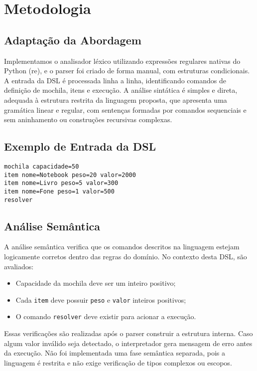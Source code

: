 \documentclass[conference]{IEEEtran}
\begin{document}
\section{Metodologia}

\subsection{Adaptação da Abordagem}
Implementamos o analisador léxico utilizando expressões regulares nativas do Python (re), e o parser foi criado de forma manual, com estruturas condicionais. A entrada da DSL é processada linha a linha, identificando comandos de definição de mochila, itens e execução. A análise sintática é simples e direta, adequada à estrutura restrita da linguagem proposta, que apresenta uma gramática linear e regular, com sentenças formadas por comandos sequenciais e sem aninhamento ou construções recursivas complexas.

\subsection{Exemplo de Entrada da DSL}
\begin{lstlisting}
mochila capacidade=50
item nome=Notebook peso=20 valor=2000
item nome=Livro peso=5 valor=300
item nome=Fone peso=1 valor=500
resolver
\end{lstlisting}

\subsection{Análise Semântica}
A análise semântica verifica que os comandos descritos na linguagem estejam logicamente corretos dentro das regras do domínio. No contexto desta DSL, são avaliados:
\begin{itemize}
    \item Capacidade da mochila deve ser um inteiro positivo;
    \item Cada \texttt{item} deve possuir \texttt{peso} e \texttt{valor} inteiros positivos;
    \item O comando \texttt{resolver} deve existir para acionar a execução.
\end{itemize}
Essas verificações são realizadas após o parser construir a estrutura interna. Caso algum valor inválido seja detectado, o interpretador gera mensagem de erro antes da execução. Não foi implementada uma fase semântica separada, pois a linguagem é restrita e não exige verificação de tipos complexos ou escopos.
\end{document}
